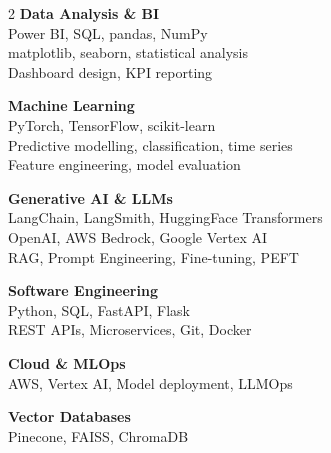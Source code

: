 \documentclass[10pt,a4paper]{article}
\begin{document}
\begin{multicols}{2}
\textbf{Data Analysis \& BI}\\
Power BI, SQL, pandas, NumPy\\
matplotlib, seaborn, statistical analysis\\
Dashboard design, KPI reporting

\medskip
\textbf{Machine Learning}\\
PyTorch, TensorFlow, scikit-learn\\
Predictive modelling, classification, time series\\
Feature engineering, model evaluation

\medskip
\textbf{Generative AI \& LLMs}\\
LangChain, LangSmith, HuggingFace Transformers\\
OpenAI, AWS Bedrock, Google Vertex AI\\
RAG, Prompt Engineering, Fine-tuning, PEFT

\columnbreak

\textbf{Software Engineering}\\
Python, SQL, FastAPI, Flask\\
REST APIs, Microservices, Git, Docker

\medskip
\textbf{Cloud \& MLOps}\\
AWS, Vertex AI, Model deployment, LLMOps

\medskip
\textbf{Vector Databases}\\
Pinecone, FAISS, ChromaDB

\end{multicols}
\end{document}
